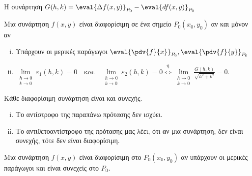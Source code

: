 \begin{rem}
\item {}
  Η συνάρτηση $ G(h,k) = \eval{\Delta f(x,y)}_{P_{0}} - \eval{df(x,y)}_{P_{0}} $
\end{rem}

\begin{dfn}[Επαναδιατύπωση]
\item {}
  Μια συνάρτηση $ f(x,y) $ είναι \textcolor{Col1}{διαφορίσιμη} σε ένα σημείο 
  $ P_{0}(x_{0}, y_{0}) $ αν και μόνον αν
  \begin{enumerate}[i)]
    \item Υπάρχουν οι μερικές παράγωγοι $ \eval{\pdv{f}{x}}_{P_{0}},
      \eval{\pdv{f}{y}}_{P_{0}} $
    \item $ \lim\limits_{\substack{h\to 0 \\k \to 0}} \varepsilon _{1}(h,k) = 
      0 \quad \text{και} \quad \lim\limits_{\substack{h\to 0 \\k \to 0}} 
      \varepsilon _{2}(h,k)=0 \overset{\text{ή}}{\Leftrightarrow} 
      \lim\limits_{\substack{h\to 0 \\k \to 0}} 
      \frac{G(h,k)}{\sqrt{h^{2}+k^{2}}} = 0 $.
  \end{enumerate}
\end{dfn}

\begin{prop}
  Κάθε διαφορίσιμη συνάρτηση είναι και συνεχής.
\end{prop}

\begin{rem}
\item {}
  \begin{enumerate}[i)]
    \item Το αντίστροφο της παραπάνω πρότασης δεν ισχύει.
    \item Το αντιθετοαντίστροφο της πρότασης μας λέει, ότι αν μια συνάρτηση, 
      δεν είναι συνεχής, τότε δεν είναι διαφορίσιμη.
  \end{enumerate}
\end{rem}

\begin{thm}
\item {}
  Μια συνάρτηση $ f(x,y) $ είναι διαφορίσιμη στο $ P_{0}(x_{0}, y_{0}) $ 
  αν υπάρχουν οι μερικές παράγωγοι και είναι συνεχείς στο $ P_{0} $.
\end{thm}

